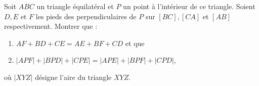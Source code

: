 Soit $ABC$ un triangle équilatéral et $P$ un point à l'intérieur de ce triangle. Soient $D, E$ et $F$ les pieds des perpendiculaires de $P$ sur $[BC], [CA]$ et $[AB]$ respectivement. Montrer que :
\begin{enumerate}
\item $AF+BD+CE=AE+BF+CD$ et que
\item $|APF|+|BPD|+|CPE|=|APE|+|BPF|+|CPD|$,
\end{enumerate}
où $|XYZ|$ désigne l'aire du triangle $XYZ$.